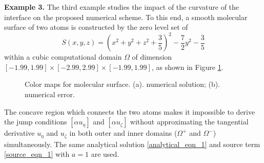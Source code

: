 \documentclass[dissertation]{uathesis}
\begin{document}
\begin{body}
{\flushleft \bf Example 3.} The third example studies the impact of the curvature of the interface on the proposed numerical scheme. To this end, a smooth molecular surface of two atoms is constructed by the zero level set of 
%
\begin{equation}
S(x,y,z) = (x^{2}+y^{2}+z^{2}+\frac{3}{5})^2 -\frac{7}{2}y^{2} - \frac{3}{5}
\end{equation}
%
within a cubic computational domain $\Omega$ of dimension $[-1.99,1.99]\times[-2.99,2.99]\times[-1.99,1.99]$, as shown in Figure \ref{fig:color_map_molecular}. 
%
\begin{figure}[!ht]
	\begin{center}
	\end{center}
	\caption{Color maps for molecular surface. (a). numerical solution; (b). numerical error.}
	\label{fig:color_map_molecular}
\end{figure}
%
The concave region which connects the two atoms makes it impossible to derive the jump conditions $[\alpha u_{\eta}]$ and $[\alpha u_{\zeta}]$ without approximating the tangential derivative $u_{\eta}$ and $u_{\zeta}$ in both outer and inner domains ($\Omega^{+}$ and $\Omega^{-}$) simultaneously. The same analytical solution \eqref{analytical_eqn_1} and source term \eqref{source_eqn_1} with $a=1$ are used. 



\end{body}
\end{document}
